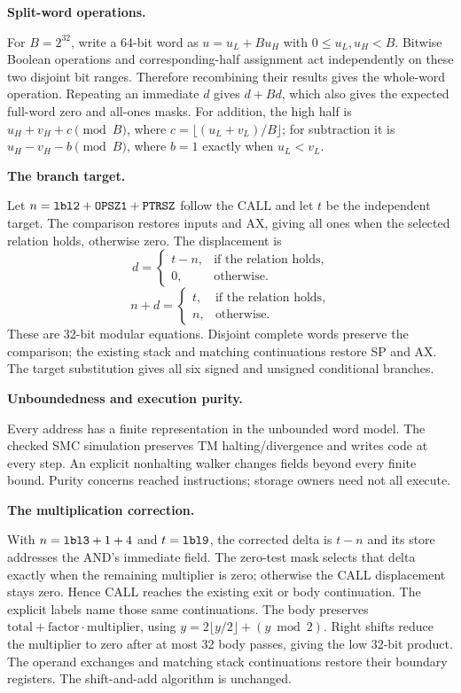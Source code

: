 \documentclass[10pt,a4paper]{article}
\newcommand{\code}[1]{\texttt{\detokenize{#1}}}
\newcommand{\itemtitle}[1]{\par\vspace{0pt}\textbf{#1}\par\nopagebreak}
\begin{document}
\itemtitle{Split-word operations.}
For $B=2^{32}$, write a 64-bit word as $u=u_L+B u_H$ with
$0\leq u_L,u_H<B$. Bitwise Boolean operations and corresponding-half
assignment act independently on these two disjoint bit ranges. Therefore
recombining their results gives the whole-word operation. Repeating an
immediate $d$ gives $d+B d$, which also gives the expected full-word zero
and all-ones masks. For addition, the high half is
$u_H+v_H+c\pmod B$, where
$c=\lfloor(u_L+v_L)/B\rfloor$; for subtraction it is
$u_H-v_H-b\pmod B$, where $b=1$ exactly when $u_L<v_L$.


\itemtitle{The branch target.}
Let $n=\code{lbl2}+\code{OPSZ1}+\code{PTRSZ}$ follow the CALL and let
$t$ be the independent target. The comparison restores inputs and AX, giving
all ones when the selected relation holds, otherwise zero. The displacement is
\[
 d=\begin{cases}t-n,&\text{if the relation holds},\\0,&\text{otherwise}.
 \end{cases}
\]
\[
 n+d=\begin{cases}t,&\text{if the relation holds},\\n,&\text{otherwise}.
 \end{cases}
\]
These are 32-bit modular equations. Disjoint complete words preserve the
comparison; the existing stack and matching continuations restore SP and AX.
The target substitution gives all six signed and unsigned conditional branches.

\itemtitle{Unboundedness and execution purity.}
Every address has a finite representation in the unbounded word model.
The checked SMC simulation preserves TM halting/divergence and writes code at
every step. An explicit nonhalting walker changes fields beyond every finite
bound. Purity concerns reached instructions; storage owners need not all execute.

\itemtitle{The multiplication correction.}
With $n=\code{lbl3}+1+4$ and $t=\code{lbl9}$, the corrected delta is
$t-n$ and its store addresses the AND's immediate field. The zero-test mask
selects that delta exactly when the remaining multiplier is zero; otherwise
the CALL displacement stays zero. Hence CALL reaches the existing exit or
body continuation. The explicit labels name those same continuations.
The body preserves $\mathrm{total}+\mathrm{factor}\cdot\mathrm{multiplier}$,
using $y=2\lfloor y/2\rfloor+(y\bmod2)$. Right shifts reduce the multiplier
to zero after at most 32 body passes, giving the low 32-bit product. The
operand exchanges and matching stack continuations restore their boundary
registers. The shift-and-add algorithm is unchanged.
\end{document}
